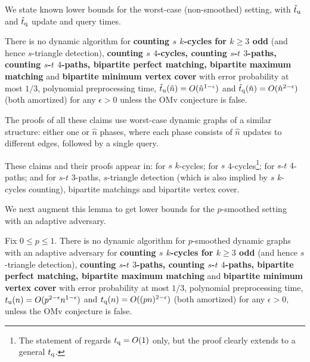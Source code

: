 \documentclass[letter,11pt]{article}
\newcommand{\omv}{\textnormal{\textsf{OMv}}\xspace}
\newcommand{\paths}[3]{${#1}$-${#2}$ ${#3}$-paths\xspace}
\newcommand{\tu}{t_{\textnormal{u}}}
\newcommand{\tq}{t_{\textnormal{q}}}
\begin{document}
We state known lower bounds for the worst-case (non-smoothed) setting,
with $\hat \tu$ and $\hat \tq$ update and query times.
\begin{lemma}
	\label{lem:lb for many problems-original}
    There is no dynamic algorithm for 
    \textbf{%
    	counting $s$ $k$-cycles for $k\geq 3$ odd} (and hence $s$-triangle detection),
    \textbf{%
    	counting $s$ $4$-cycles,
    	counting \paths{s}{t}{3},
    	counting \paths{s}{t}{4},
    	bipartite perfect matching,
    	bipartite maximum matching} 
    	and 
    	\textbf{bipartite minimum vertex cover} 
	with error probability at most $1/3$,
	polynomial preprocessing time,
	$\hat\tu(\hat n)=O(\hat{n}^{1-\epsilon})$
    and
    $\hat\tq(\hat n)
    =O(\hat{n}^{2-\epsilon})$
    (both amortized)
	for any $\epsilon>0$ 
	unless the \omv conjecture is false.	

    The proofs of all these claims use worst-case dynamic  graphs of a similar structure:
    either one or $\hat n$ phases, where each phase consists of $\hat n$ updates to different edges, followed by a single query.
\end{lemma}

These claims and their proofs appear in: 
\cite[Theorem 26]{HanauerHH22} for
$s$ $k$-cycles;
\cite[Lemma 7.6]{HLS22} for $s$ 4-cycles\footnote{The statement of \cite[Lemma 7.6]{HLS22} regards $\tq=O(1)$ only, but the proof clearly extends to a general $\tq$.};
\cite[Lemma 7.5]{HLS22} for \paths{s}{t}{4};
and
\cite[Corollary~3.4 and footnote~9]{HenzingerKNS15} for
\paths{s}{t}{3},
$s$-triangle detection (which is also implied by $s$ $k$-cycles counting),
bipartite matchings
and
bipartite vertex cover.

We next augment this lemma to get lower bounds for the $p$-smoothed setting with an adaptive adversary.

\begin{theorem}
	\label{thm:lb for many problems-smoothed advers}
	Fix $0 \leq p \leq 1$. 
	There is no dynamic algorithm for
	 $p$-smoothed dynamic graphs with an adaptive adversary
	 for 
	\textbf{%
		counting $s$ $k$-cycles for $k\geq 3$ odd} (and hence $s$-triangle detection),
	\textbf{
		counting \paths{s}{t}{3},
		counting \paths{s}{t}{4},
		bipartite perfect matching,
		bipartite maximum matching} 
	and 
	\textbf{bipartite minimum vertex cover} 
	with error probability at most $1/3$,
	polynomial preprocessing time,
	$\tu(n)=O(p^{2-\epsilon}n^{1-\epsilon})$
	and
	$\tq(n)
	=O((pn)^{2-\epsilon})$
	(both amortized)
	for any $\epsilon>0$,
	unless the \omv conjecture is false.	
\end{theorem}
\end{document}
